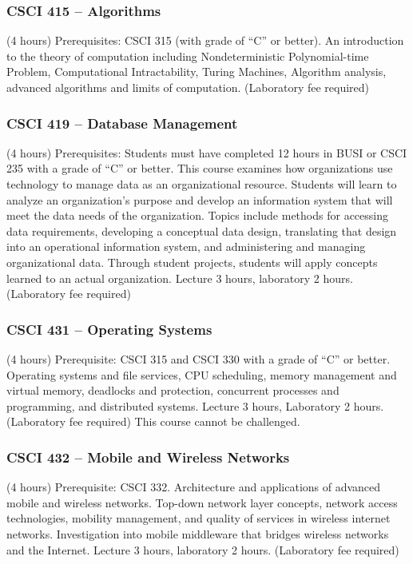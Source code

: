 \subsubsection{CSCI 415 -- Algorithms}%
\label{course:CSCI:415}
(4 hours) Prerequisites: CSCI 315 (with grade of “C” or better). An introduction to the theory of computation including Nondeterministic Polynomial-time Problem, Computational Intractability, Turing Machines, Algorithm analysis, advanced algorithms and limits of computation. (Laboratory fee required)

\subsubsection{CSCI 419 -- Database Management}%
\label{course:CSCI:419}
(4 hours) Prerequisites: Students must have completed 12 hours in BUSI or CSCI 235 with a grade of “C” or better. This course examines how organizations use technology to manage data as an organizational resource. Students will learn to analyze an organization’s purpose and develop an information system that will meet the data needs of the organization. Topics include methods for accessing data requirements, developing a conceptual data design, translating that design into an operational information system, and administering and managing organizational data. Through student projects, students will apply concepts learned to an actual organization. Lecture 3 hours, laboratory 2 hours. (Laboratory fee required)

\subsubsection{CSCI 431 -- Operating Systems}%
\label{course:CSCI:431}
(4 hours) Prerequisite: CSCI 315 and CSCI 330 with a grade of “C” or better. Operating systems and file services, CPU scheduling, memory management and virtual memory, deadlocks and protection, concurrent processes and programming, and distributed systems. Lecture 3 hours, Laboratory 2 hours. (Laboratory fee required) This course cannot be challenged.

\subsubsection{CSCI 432 -- Mobile and Wireless Networks}%
\label{course:CSCI:432}
(4 hours) Prerequisite: CSCI 332. Architecture and applications of advanced mobile and wireless networks. Top-down network layer concepts, network access technologies, mobility management, and quality of services in wireless internet networks. Investigation into mobile middleware that bridges wireless networks and the Internet. Lecture 3 hours, laboratory 2 hours. (Laboratory fee required)

